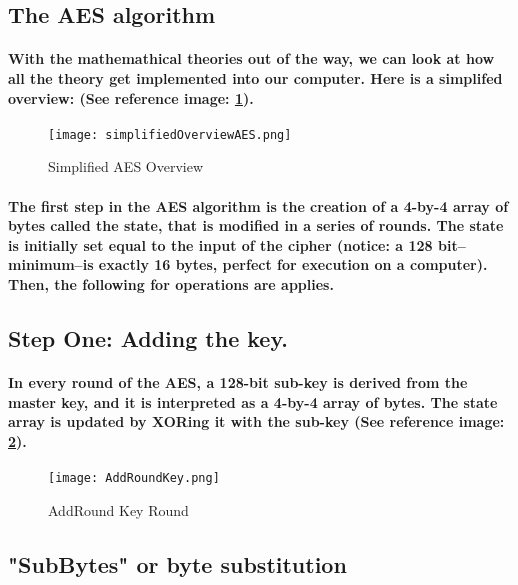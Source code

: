 \subsection{The AES algorithm}

\paragraph{With the mathemathical theories out of the way, we can look at how all the theory get implemented into our computer. Here is a simplifed overview: (See reference image: \ref{fig: AESovereview}).}



\begin{figure}[H]
\centering
\texttt{[image: simplifiedOverviewAES.png]}
\caption{\label{fig: AESovereview} Simplified AES Overview}\cite[Webpage]{Crawford}
\end{figure}


\paragraph{The first step in the AES algorithm is the creation of a 4-by-4 array of bytes called the state, that is modified in a series of rounds. The state is initially set equal to the input of the cipher (notice: a 128 bit--minimum--is exactly 16 bytes, perfect for execution on a computer). Then, the following for operations are applies.}\cite[p. 186]{Katz}

\subsection{Step One: Adding the key.}
\paragraph{In every round of the AES, a 128-bit sub-key is derived from the master key, and it is interpreted as a 4-by-4 array of bytes. The state array is updated by XORing it with the sub-key (See reference image: \ref{fig: AddRoundKey}).}\cite[p. 186]{Katz}

\begin{figure}[H]
\centering
\texttt{[image: AddRoundKey.png]}
\caption{\label{fig: AddRoundKey} AddRound Key Round}\cite[Webpage]{Crawford}
\end{figure}


\subsection{"SubBytes" or byte substitution}
